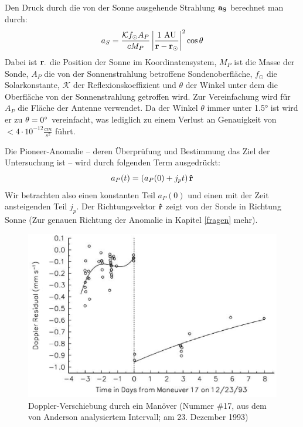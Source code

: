 Den Druck durch die von der Sonne ausgehende Strahlung $\bf a_S$ berechnet man durch:
\begin{equation}
a_S = \frac{\mathcal{K}f_\odot A_P}{c M_P} \left| \frac{1\ \mathrm{AU}}{{\bf r}-{\bf r_\odot}} \right|^2 \cos\theta
\end{equation}
Dabei ist $\bf r_\cdot$ die Position der Sonne im Koordinatensystem, $M_P$ ist die Masse der Sonde, $A_P$ die von der Sonnenstrahlung betroffene Sondenoberfläche, $f_\odot$ die Solarkonstante, $\mathcal{K}$ der Reflexionskoeffizient und $\theta$ der Winkel unter dem die Oberfläche von der Sonnenstrahlung getroffen wird.
Zur Vereinfachung wird für $A_P$ die Fläche der Antenne verwendet.
Da der Winkel $\theta$ immer unter 1.5° ist wird er zu $\theta = 0\degree$ vereinfacht, was lediglich zu einem Verlust an Genauigkeit von $< 4 \cdot 10^{-12} \frac{cm}{s^2}$ führt\cite{Markwardt2002}.

Die Pioneer-Anomalie – deren Überprüfung und Bestimmung das Ziel der Untersuchung ist – wird durch folgenden Term ausgedrückt:
\begin{equation}
a_P(t) = \left( a_P(0) + j_pt\right){\bf \hat{r}}
\end{equation}
Wir betrachten also einen konstanten Teil $a_P(0)$ und einen mit der Zeit ansteigenden Teil $j_p$. Der Richtungsvektor $\bf \hat{r}$ zeigt von der Sonde in Richtung Sonne (Zur genauen Richtung der Anomalie in Kapitel \ref{fragen} mehr).

\begin{figure}[htbb]
\begin{minipage}[t]{.8\linewidth}
	\centering
	\includegraphics[width=\linewidth]{images/manoever}
  \caption{Doppler-Verschiebung durch ein Manöver (Nummer \#17, aus dem von Anderson\cite{Anderson2002} analysiertem Intervall; am 23. Dezember 1993)}\label{fig:manoever}
\end{minipage}
	\centering
 \end{figure}

